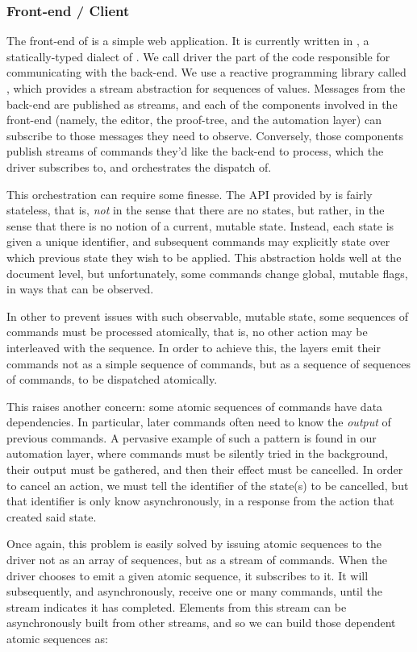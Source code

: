 \subsubsection*{Front-end / Client}

The front-end of \PeaCoq{} is a simple web application.  It is currently written
in \TypeScript{}, a statically-typed dialect of \JavaScript{}.  We call driver
the part of the code responsible for communicating with the back-end.  We use a
reactive programming library called \RxJS{}, which provides a stream abstraction
for sequences of values.  Messages from the back-end are published as streams,
and each of the components involved in the front-end (namely, the editor, the
proof-tree, and the automation layer) can subscribe to those messages they need
to observe.  Conversely, those components publish streams of commands they'd
like the back-end to process, which the driver subscribes to, and orchestrates
the dispatch of.

This orchestration can require some finesse.  The API provided by \Coq{} is
fairly stateless, that is, \emph{not} in the sense that there are no states, but
rather, in the sense that there is no notion of a current, mutable state.
Instead, each state is given a unique identifier, and subsequent commands may
explicitly state over which previous state they wish to be applied.  This
abstraction holds well at the document level, but unfortunately, some commands
change global, mutable flags, in ways that can be observed.

In other to prevent issues with such observable, mutable state, some sequences
of commands must be processed atomically, that is, no other action may be
interleaved with the sequence.  In order to achieve this, the layers emit their
commands not as a simple sequence of commands, but as a sequence of sequences of
commands, to be dispatched atomically.

This raises another concern: some atomic sequences of commands have data
dependencies.  In particular, later commands often need to know the
\emph{output} of previous commands.  A pervasive example of such a pattern is
found in our automation layer, where commands must be silently tried in the
background, their output must be gathered, and then their effect must be
cancelled.  In order to cancel an action, we must tell \Coq{} the identifier of
the state(s) to be cancelled, but that identifier is only know asynchronously,
in a response from the action that created said state.

Once again, this problem is easily solved by issuing atomic sequences to the
driver not as an array of sequences, but as a stream of commands.  When the
driver chooses to emit a given atomic sequence, it subscribes to it.  It will
subsequently, and asynchronously, receive one or many commands, until the stream
indicates it has completed.  Elements from this stream can be asynchronously
built from other streams, and so we can build those dependent atomic sequences
as:

